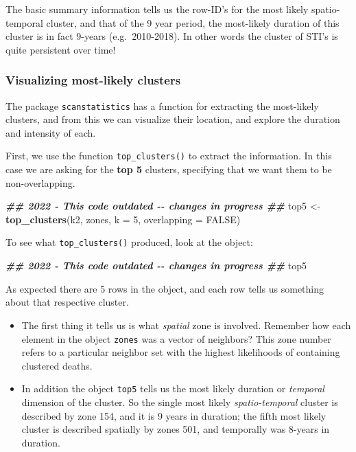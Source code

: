 \documentclass[
]{book}
\newenvironment{Shaded}{\begin{snugshade}}{\end{snugshade}}
\newcommand{\AttributeTok}[1]{\textcolor[rgb]{0.13,0.29,0.53}{#1}}
\newcommand{\ConstantTok}[1]{\textcolor[rgb]{0.56,0.35,0.01}{#1}}
\newcommand{\DecValTok}[1]{\textcolor[rgb]{0.00,0.00,0.81}{#1}}
\newcommand{\DocumentationTok}[1]{\textcolor[rgb]{0.56,0.35,0.01}{\textbf{\textit{#1}}}}
\newcommand{\FunctionTok}[1]{\textcolor[rgb]{0.13,0.29,0.53}{\textbf{#1}}}
\newcommand{\NormalTok}[1]{#1}
\newcommand{\OtherTok}[1]{\textcolor[rgb]{0.56,0.35,0.01}{#1}}
\providecommand{\tightlist}{%
  \setlength{\itemsep}{0pt}\setlength{\parskip}{0pt}}
\begin{document}
The basic summary information tells us the row-ID's for the most likely spatio-temporal cluster, and that of the 9 year period, the most-likely duration of this cluster is in fact 9-years (e.g.~2010-2018). In other words the cluster of STI's is quite persistent over time!

\hypertarget{visualizing-most-likely-clusters}{%
\subsubsection{Visualizing most-likely clusters}\label{visualizing-most-likely-clusters}}

The package \texttt{scanstatistics} has a function for extracting the most-likely clusters, and from this we can visualize their location, and explore the duration and intensity of each.

First, we use the function \texttt{top\_clusters()} to extract the information. In this case we are asking for the \textbf{top 5} clusters, specifying that we want them to be non-overlapping.

\begin{Shaded}
\begin{Highlighting}[]
\DocumentationTok{\#\# 2022 {-} This code outdated {-}{-} changes in progress \#\#}
\NormalTok{top5 }\OtherTok{\textless{}{-}} \FunctionTok{top\_clusters}\NormalTok{(k2, zones, }\AttributeTok{k =} \DecValTok{5}\NormalTok{, }\AttributeTok{overlapping =} \ConstantTok{FALSE}\NormalTok{)}
\end{Highlighting}
\end{Shaded}

To see what \texttt{top\_clusters()} produced, look at the object:

\begin{Shaded}
\begin{Highlighting}[]
\DocumentationTok{\#\# 2022 {-} This code outdated {-}{-} changes in progress \#\#}
\NormalTok{top5}
\end{Highlighting}
\end{Shaded}

As expected there are 5 rows in the object, and each row tells us something about that respective cluster.

\begin{itemize}
\tightlist
\item
  The first thing it tells us is what \emph{spatial} zone is involved. Remember how each element in the object \texttt{zones} was a vector of neighbors? This zone number refers to a particular neighbor set with the highest likelihoods of containing clustered deaths.\\
\item
  In addition the object \texttt{top5} tells us the most likely duration or \emph{temporal} dimension of the cluster. So the single most likely \emph{spatio-temporal} cluster is described by zone 154, and it is 9 years in duration; the fifth most likely cluster is described spatially by zones 501, and temporally was 8-years in duration.
\end{itemize}
\end{document}
